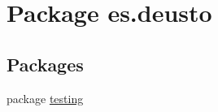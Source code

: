 \hypertarget{namespacees_1_1deusto}{}\section{Package es.\+deusto}
\label{namespacees_1_1deusto}
\subsection*{Packages}
\begin{DoxyCompactItemize}
\item 
package \hyperlink{namespacees_1_1deusto_1_1testing}{testing}
\end{DoxyCompactItemize}
